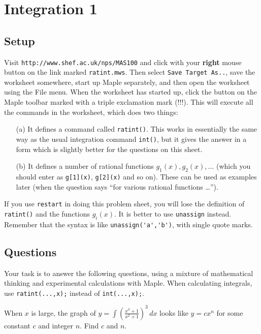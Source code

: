 \documentclass[a4paper,10pt]{amsbook}
\numberwithin{example}{chapter}
\begin{document}
\chapter{Integration 1}

\section*{Setup}

Visit \verb~http://www.shef.ac.uk/nps/MAS100~ and click with your
\textbf{right} mouse button on the link marked \verb~ratint.mws~.
Then select \verb~Save Target As..~, save the worksheet somewhere,
start up Maple separately, and then open the worksheet using the File
menu.  When the worksheet has started up, click the button on the
Maple toolbar marked with a triple exclamation mark (!!!).  This will
execute all the commands in the worksheet, which does two things:
\begin{itemize}
 \item[(a)] It defines a command called \verb~ratint()~.
  This works in essentially the same way as the usual
  integration command \verb~int()~, but it gives the answer
  in a form which is slightly better for the questions on
  this sheet.
 \item[(b)] It defines a number of rational functions
  $g_1(x),g_2(x),\dotsc$ (which you should enter as
  \verb~g[1](x)~, \verb~g[2](x)~ and so on).  These can be
  used as examples later (when the question says ``for
  various rational functions \ldots'').
\end{itemize}
If you use \verb~restart~ in doing this problem sheet, you
will lose the definition of \verb~ratint()~ and the
functions $g_i(x)$.  It is better to use \verb~unassign~
instead.  Remember that the syntax is like
\verb~unassign('a','b')~, with single quote marks.

\section*{Questions}

Your task is to answer the following questions, using a
mixture of mathematical thinking and experimental
calculations with Maple.  When calculating integrals, use
\verb~ratint(...,x);~ instead of \verb~int(...,x);~.

\begin{exercise}
 When $x$ is large, the graph of
 $y=\displaystyle\int\left(\frac{x^3+1}{x^2+1}\right)^3\,dx$
 looks like $y=cx^n$ for some constant $c$ and integer $n$.
 Find $c$ and $n$.
\end{exercise}
\end{document}
